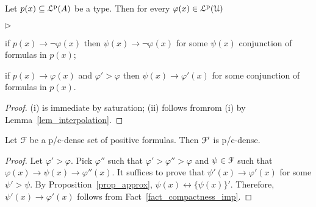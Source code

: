 \documentclass[10pt,oneside]{amsproc}
\newcommand{\mylabel}[1]{{#1}\hfill}
\renewenvironment{itemize}
  {\begin{list}{$\triangleright$}{%
  \setlength{\parskip}{0mm}
  \setlength{\topsep}{.4\baselineskip}
  \setlength{\rightmargin}{0mm}
  \setlength{\listparindent}{0mm}
  \setlength{\itemindent}{0mm}
  \setlength{\labelwidth}{3ex}
  \setlength{\itemsep}{.2\baselineskip}
  \setlength{\parsep}{.2\baselineskip}
  \setlength{\partopsep}{0mm}
  \setlength{\labelsep}{1ex}
  \setlength{\leftmargin}{\labelwidth+\labelsep}
  \let\makelabel\mylabel}}{%
\end{list}}
\begin{document}
{%

\begin{fact}\label{fact_compactness_imp}
  Let $p(x)\subseteq{\EuScript L}^{\rm p}(A)$ be a type.
  Then for every  $\varphi(x)\in{\EuScript L}^{\rm p}({\EuScript U})$
  \begin{itemize}
    \item[i.] if $p(x)\rightarrow\neg\varphi(x)$ then $\psi(x)\rightarrow\neg\varphi(x)$ for some $\psi(x)$ conjunction of formulas in $p(x)$;
    \item[ii.] if $p(x)\rightarrow\varphi(x)$ and $\varphi'>\varphi$ then $\psi(x)\rightarrow\varphi'(x)$ for some conjunction of formulas in $p(x)$.
  \end{itemize} 
\end{fact}

\begin{proof}
  (i) is immediate by saturation; (ii) follows fromrom (i) by Lemma~\ref{lem_interpolation}.
\end{proof}

\begin{fact}\label{fact_Fdense}
  Let ${\EuScript F}$ be a p/c-dense set of positive formulas.
  Then ${\EuScript F}'$ is p/c-dense.
\end{fact}

\begin{proof}
  Let $\varphi'>\varphi$.
  Pick $\varphi''$ such that $\varphi'>\varphi''>\varphi$ and $\psi\in{\EuScript F}$ such that $\varphi(x)\rightarrow\psi(x)\rightarrow\varphi''(x)$.
  It suffices to prove that $\psi'(x)\rightarrow\varphi'(x)$ for some $\psi'>\psi$.
  By Proposition~\ref{prop_approx}, $\psi(x)\leftrightarrow\{\psi(x)\}'$.
  Therefore, $\psi'(x)\rightarrow\varphi'(x)$ follows from Fact~\ref{fact_compactness_imp}.
\end{proof}

  
}
\end{document}
